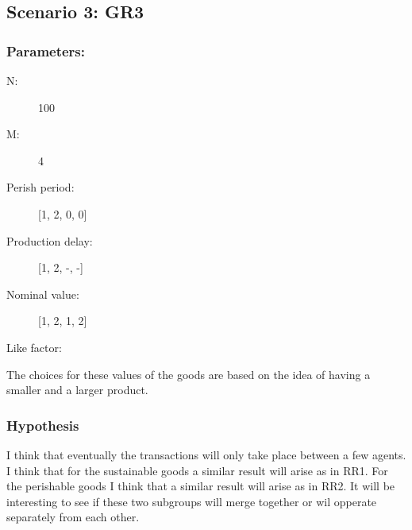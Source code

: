 \documentclass{article}
\begin{document}
\subsection{Scenario 3: GR3}
\subsubsection{Parameters:}
\begin{description}
  \item[N:] 100
  \item[M:] 4
  \item[Perish period:] [1, 2, 0, 0]
  \item[Production delay:] [1, 2, -, -]
  \item[Nominal value:] [1, 2, 1, 2]
  \item[Like factor:] 
\end{description}

The choices for these values of the goods are based on the idea of having a smaller and a larger product.

\subsubsection{Hypothesis}
I think that eventually the transactions will only take place between a few agents. I think that for the sustainable goods a similar result will arise as in RR1. For the perishable goods I think that a similar result will arise as in RR2. It will be interesting to see if these two subgroups will merge together or wil opperate separately from each other.


\newpage
\end{document}
